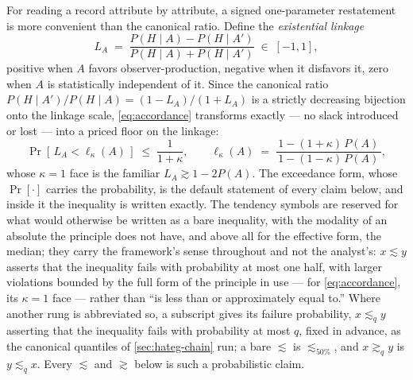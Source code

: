 \documentclass[11pt]{article}
\theoremstyle{definition}
\begin{document}
For reading a record attribute by attribute, a signed one-parameter restatement is more convenient than the canonical ratio. Define the \emph{existential linkage}
\begin{equation}
\label{eq:linkage}
L_A \;=\; \frac{P(H \mid A) - P(H \mid A')}{P(H \mid A) + P(H \mid A')} \;\in\; [-1, 1],
\end{equation}
positive when $A$ favors observer-production, negative when it disfavors it, zero when $A$ is statistically independent of it. Since the canonical ratio $P(H \mid A')/P(H \mid A) = (1 - L_A)/(1 + L_A)$ is a strictly decreasing bijection onto the linkage scale, \eqref{eq:accordance} transforms exactly --- no slack introduced or lost --- into a priced floor on the linkage:
\begin{equation}
\label{eq:linkage-floor}
\Pr\!\left[\, L_A < \ell_\kappa(A) \,\right] \;\le\; \frac{1}{1+\kappa},
\qquad
\ell_\kappa(A) \;=\; \frac{1 - (1+\kappa)\,P(A)}{\,1 - (1-\kappa)\,P(A)\,},
\end{equation}
whose $\kappa = 1$ face is the familiar $L_A \gtrsim 1 - 2P(A)$. The exceedance form, whose $\Pr[\cdot]$ carries the probability, is the default statement of every claim below, and inside it the inequality is written exactly. The tendency symbols are reserved for what would otherwise be written as a bare inequality, with the modality of an absolute the principle does not have, and above all for the effective form, the median; they carry the framework's sense throughout and not the analyst's: $x \lesssim y$ asserts that the inequality fails with probability at most one half, with larger violations bounded by the full form of the principle in use --- for \eqref{eq:accordance}, its $\kappa = 1$ face --- rather than ``is less than or approximately equal to.'' Where another rung is abbreviated so, a subscript gives its failure probability, $x \lesssim_q y$ asserting that the inequality fails with probability at most $q$, fixed in advance, as the canonical quantiles of \autoref{sec:hateg-chain} run; a bare $\lesssim$ is $\lesssim_{50\%}$, and $x \gtrsim_q y$ is $y \lesssim_q x$. Every $\lesssim$ and $\gtrsim$ below is such a probabilistic claim.
\end{document}
